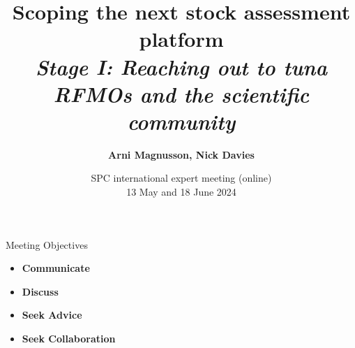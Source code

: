 \documentclass[aspectratio=169,fleqn]{beamer}
\begin{document}
\begin{frame}
  \title{\vspace{-5ex}\darkblue Scoping the next stock assessment
    platform\\[2ex]
    \it\large\darkgray
    Stage I: Reaching out to tuna RFMOs and the scientific community}
  \author{\vspace{-10ex}\darkgray\bf
    Arni Magnusson, Nick Davies}
  \date{\darkgreen SPC international expert meeting (online)\\[0.5ex]
    13 May and 18 June 2024}
  \titlepage
\end{frame}


\begin{frame}{Meeting Objectives}
  \begin{itemize}
    \item[] {\bf\darkblue Communicate} \\[5ex]
    \item[] {\bf\darkblue Discuss} \\[5ex]
    \item[] {\bf\darkblue Seek Advice} \\[5ex]
    \item[] {\bf\darkblue Seek Collaboration} \\[1ex]
  \end{itemize}
\end{frame}

\end{document}

